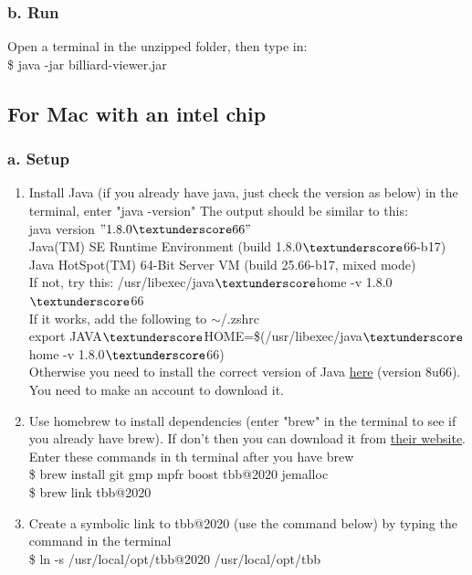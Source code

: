 \documentclass[11pt]{report}
\begin{document}
\subsubsection{b. Run}
  Open a terminal in the unzipped folder, then type in: \\
  \$ java -jar billiard-viewer.jar
\subsection{For Mac with an intel chip}
\subsubsection*{a. Setup}
\begin{enumerate}[Step 1.]
  \item Install Java (if you already have java, just check the version as below) in the terminal, enter "java -version"
    The output should be similar to this: \\
    java version $"1.8.0\textunderscore66"$ \\
    Java(TM) SE Runtime Environment (build 1.8.0$\textunderscore$66-b17) \\
    Java HotSpot(TM) 64-Bit Server VM (build 25.66-b17, mixed mode) \\
    If not, try this: /usr/libexec/java$\textunderscore$home -v 1.8.0$\textunderscore$66 \\
    If it works, add the following to $\sim$/.zshrc \\
      export JAVA$\textunderscore$HOME=\$(/usr/libexec/java$\textunderscore$home -v 1.8.0$\textunderscore$66) \\
    Otherwise you need to install the correct version of Java \href{https://www.oracle.com/ca-en/java/technologies/javase/javase8-archive-downloads.html}{here} (version 8u66). 
    You need to make an account to download it.
  \item Use homebrew to install dependencies (enter "brew" in the terminal to see if you already have brew). If don't then you can download it from \href{https://docs.brew.sh/Installation}{their website}. \\
  Enter these commands in th terminal after you have brew \\
	\$ brew install git gmp mpfr boost tbb@2020 jemalloc \\
	\$ brew link tbb@2020
  \item Create a symbolic link to tbb@2020 (use the command below) by typing the command in the terminal \\
	\$ ln -s /usr/local/opt/tbb@2020 /usr/local/opt/tbb 
\end{enumerate}
\end{document}

